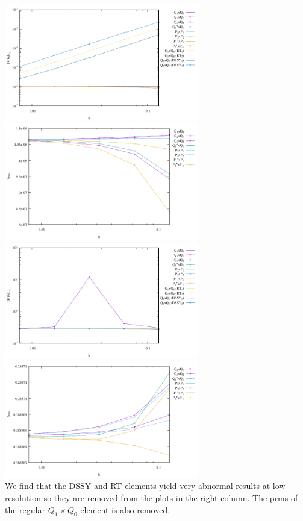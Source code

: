 \begin{center}
\includegraphics[width=8.5cm]{python_codes/fieldstone_120/results_sinker/errors-velocity-all}
\includegraphics[width=8.5cm]{python_codes/fieldstone_120/results_sinker/errors-velocity-subset}\\
\includegraphics[width=8.5cm]{python_codes/fieldstone_120/results_sinker/errors-pressure-all}
\includegraphics[width=8.5cm]{python_codes/fieldstone_120/results_sinker/errors-pressure-subset}\\
{\captionfont We find that the DSSY and RT elements yield very abnormal results at low resolution
so they are removed from the plots in the right column. The prms of the regular $Q_1\times Q_0$ element 
is also removed.}
\end{center}

